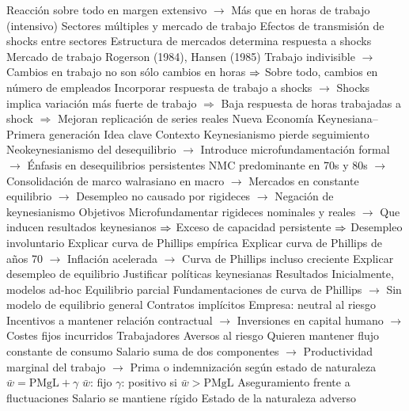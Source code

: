 \documentclass{nuevotema}
\begin{document}
\begin{esquemal}
				\4[] Reacción sobre todo en margen extensivo
				\4[] $\to$ Más que en horas de trabajo (intensivo)
				\4 Sectores múltiples y mercado de trabajo
				\4[] Efectos de transmisión de shocks entre sectores
				\4[] Estructura de mercados determina respuesta a shocks
				\4 Mercado de trabajo
				\4[] Rogerson (1984), Hansen (1985)
				\4[] Trabajo indivisible
				\4[] $\to$ Cambios en trabajo no son sólo cambios en horas
				\4[] $\then$ Sobre todo, cambios en número de empleados
				\4[] Incorporar respuesta de trabajo a shocks
				\4[] $\to$ Shocks implica variación más fuerte de trabajo
				\4[] $\Rightarrow$ Baja respuesta de horas trabajadas a shock
				\4[] $\Rightarrow$ Mejoran replicación de series reales
		\2 Nueva Economía Keynesiana--Primera generación
			\3 Idea clave
				\4 Contexto
				\4[] Keynesianismo pierde seguimiento
				\4[] Neokeynesianismo del desequilibrio
				\4[] $\to$ Introduce microfundamentación formal
				\4[] $\to$ Énfasis en desequilibrios persistentes
				\4[] NMC predominante en 70s y 80s
				\4[] $\to$ Consolidación de marco walrasiano en macro
				\4[] $\to$ Mercados en constante equilibrio
				\4[] $\to$ Desempleo no causado por rigideces
				\4[] $\to$ Negación de keynesianismo
				\4 Objetivos
				\4[] Microfundamentar rigideces nominales y reales
				\4[] $\to$ Que inducen resultados keynesianos
				\4[] $\then$ Exceso de capacidad persistente
				\4[] $\then$ Desempleo involuntario
				\4[] Explicar curva de Phillips empírica
				\4[] Explicar curva de Phillips de años 70
				\4[] $\to$ Inflación acelerada
				\4[] $\to$ Curva de Phillips incluso creciente
				\4[] Explicar desempleo de equilibrio
				\4[] Justificar políticas keynesianas
				\4 Resultados
				\4[] Inicialmente, modelos ad-hoc
				\4[] Equilibrio parcial
				\4[] Fundamentaciones de curva de Phillips
				\4[] $\to$ Sin modelo de equilibrio general
			\3 Contratos implícitos
				\4 Empresa:
				\4[] neutral al riesgo
				\4[] Incentivos a mantener relación contractual
				\4[] $\to$ Inversiones en capital humano
				\4[] $\to$ Costes fijos incurridos
				\4 Trabajadores
				\4[] Aversos al riesgo
				\4[] Quieren mantener flujo constante de consumo
				\4 Salario suma de dos componentes
				\4[] $\to$ Productividad marginal del trabajo
				\4[] $\to$ Prima o indemnización según estado de naturaleza
				\4[$\Rightarrow$] $\bar{w} = \text{PMgL} + \gamma$
				\4[] $\bar{w}$: fijo
				\4[] $\gamma$: positivo si $\bar{w} > \text{PMgL}$
				\4[$\then$] Aseguramiento frente a fluctuaciones
				\4[$\then$] Salario se mantiene rígido
				\4 Estado de la naturaleza adverso

\end{esquemal}
\end{document}
